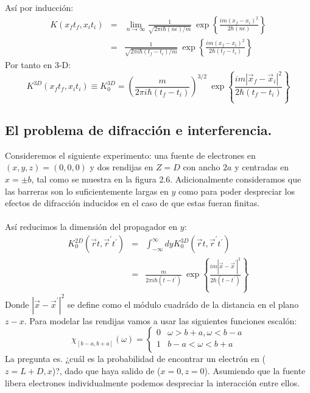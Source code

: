Así por inducción:
\begin{eqnarray}
\nonumber K(x_{f}t_{f},x_{i}t_{i})&=&\lim_{n\to\infty}\frac{1}{\sqrt{2\pi i\hbar(n\epsilon)/m}}\ \exp\left\{ \frac{im(x_{f}-x_{i})^{2}}{2\hbar(n\epsilon)}\right\} \\
&=& \frac{1}{\sqrt{2\pi i\hbar(t_{f}-t_{i})/m}}\ \exp\left\{ \frac{im(x_{f}-x_{i})^{2}}{2\hbar(t_{f}-t_{i})}\right\} 
\end{eqnarray}
Por tanto en 3-D:
\begin{equation}
K^{3D}(x_{f}t_{f},x_{i}t_{i})\equiv K_{0}^{3D}=\left(\frac{m}{2\pi i\hbar(t_{f}-t_{i})}\right)^{3/2}\ \exp\left\{ \frac{im|\vec{x}_{f}-\vec{x}_{i}|^{2}}{2\hbar(t_{f}-t_{i})}\right\} 
\end{equation}


\subsection{El problema de difracción e interferencia.}
Consideremos el siguiente experimento: una fuente de electrones en $(x,y,z)=(0,0,0)$ y dos rendijas en $Z=D$ con ancho $2a$ y centradas en $x=\pm b$, tal como se muestra en la figura 2.6. Adicionalmente consideramos que las barreras son lo suficientemente largas en $y$ como para poder despreciar los efectos de difracción inducidos en el caso de que estas fueran finitas.\\
\\
Así reducimos la dimensión del propagador en $y$:
\begin{eqnarray}
\nonumber K_{0}^{2D}(\vec{r}t,\vec{r}^{\prime} t^{\prime})&=&\int_{-\infty}^{\infty}dyK_{0}^{3D}(\vec{r}t,\vec{r}^{\prime} t^{\prime})\\
&=& \frac{m}{2\pi i\hbar(t-t^{\prime})}\ \exp\left\{ \frac{im|\vec{x}-\vec{x}^{\prime}|^{2}}{2\hbar(t-t^{\prime})}\right\} 
\end{eqnarray}
Donde $|\vec{x}-\vec{x}^{\prime}|^{2}$ se define como el módulo cuadrádo de la distancia en el plano $z-x$. Para modelar las rendijas vamos a usar las siguientes funciones escalón:
\[   
\chi_{[b-a,b+a]}(\omega) = 
     \begin{cases}
       0 &\omega>b+a,\omega<b-a\\
       1 &b-a<\omega<b+a \\
      
     \end{cases}
\]
La pregunta es. ¿cuál es la probabilidad de encontrar un electrón en ($z=L+D,x$)?, dado que haya salido de ($x=0,z=0$). Asumiendo que la fuente libera electrones individualmente podemos despreciar la interacción entre ellos.
